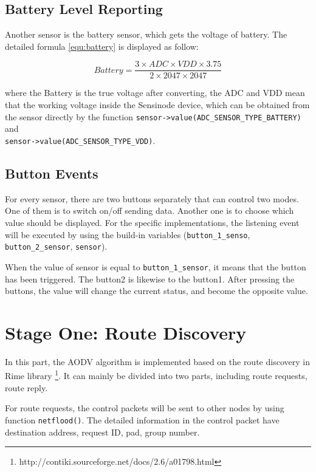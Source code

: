 \subsection{Battery Level Reporting}
Another sensor is the battery sensor, which gets the voltage of battery. The detailed formula \ref{equ:battery} is displayed as follow:

\begin{equation}
    Battery = 
    \frac{3 \times ADC \times VDD \times 3.75}{2 \times 2047 \times 2047}
\label{equ:battery}
\end{equation}

where the Battery is the true voltage after converting, the ADC and VDD mean that the working voltage inside the Sensinode device, which can be obtained from the sensor directly by the function \texttt{sensor->value(ADC\_SENSOR\_TYPE\_BATTERY)} and \\
\texttt{sensor->value(ADC\_SENSOR\_TYPE\_VDD)}.

\subsection{Button Events}
For every sensor, there are two buttons separately that can control two modes. One of them is to switch on/off sending data. Another one is to choose which value should be displayed. For the specific implementations, the listening event will be executed by using the build-in variables (\texttt{button\_1\_senso}, \texttt{button\_2\_sensor}, \texttt{sensor}). 

When the value of sensor is equal to \texttt{button\_1\_sensor}, it means that the button has been triggered. The button2 is likewise to the button1. After pressing the buttons, the value will change the current status, and become the opposite value. 

\section{Stage One: Route Discovery}

In this part, the AODV algorithm is implemented based on the route discovery in Rime library \citep{dunkels2007rime,dunkels2007adaptive} \footnote{http://contiki.sourceforge.net/docs/2.6/a01798.html}. 
It can mainly be divided into two parts, including route requests, route reply.

For route requests, the control packets will be sent to other nodes by using function \texttt{netflood()}. The detailed information in the control packet have destination address, request ID, pad, group number.

